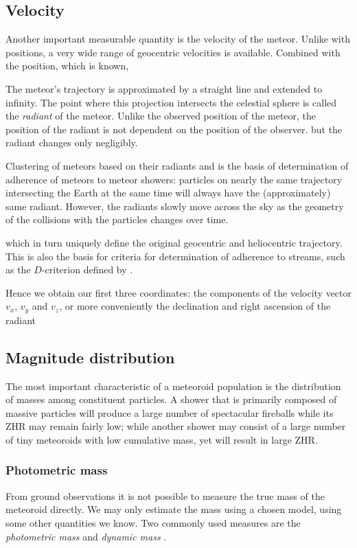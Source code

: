     \subsection{Velocity} \label{msv}
        Another important measurable quantity is the velocity of the meteor.
        Unlike with positions, a very wide range of geocentric velocities is available.
        Combined with the position, which is known, 


        The meteor's trajectory is approximated by a straight line and extended to infinity.
        The point where this projection intersects the celestial sphere is called the \emph{radiant} of the meteor.
        Unlike the observed position of the meteor, the position of the radiant is not dependent on
        the position of the observer. but the radiant changes only negligibly.

        Clustering of meteors based on their radiants and is the basis of determination of
        adherence of meteors to meteor showers: particles on nearly the same trajectory intersecting
        the Earth at the same time will always have the (approximately) same radiant.
        However, the radiants slowly move across the sky as the geometry of the collisions
        with the particles changes over time.

        which in turn uniquely define the original geocentric and heliocentric trajectory.
        This is also the basis for criteria for determination of adherence to streams,
        such as the $D$-criterion defined by \citet{southworth+1964}.

        Hence we obtain our first three coordinates: the components of the velocity vector $v_x$, $v_y$ and $v_z$,
        or more conveniently the declination and right ascension of the radiant

    \subsection{Magnitude distribution} \label{msm}
        The most important characteristic of a meteoroid population is the distribution of masses
        among constituent particles. A shower that is primarily composed of massive particles
        will produce a large number of spectacular fireballs while its ZHR may remain fairly low;
        while another shower may consist of a large number of tiny meteoroids with low cumulative mass,
        yet will result in large ZHR.

        \subsubsection{Photometric mass} \label{msmp}
            From ground observations it is not possible to measure the true mass of the meteoroid directly.
            We may only estimate the mass using a chosen model, using some other quantities we know.
            Two commonly used measures are the \emph{photometric mass} and \emph{dynamic mass} \citep{ceplecha1966}.

